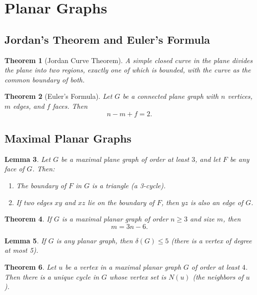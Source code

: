\documentclass{article}
\newtheorem{theorem}{Theorem}[section]
\newtheorem{lemma}[theorem]{Lemma}
\begin{document}
\section{Planar Graphs}

\subsection{Jordan's Theorem and Euler's Formula}
\begin{theorem}[Jordan Curve Theorem]
A simple closed curve in the plane divides the plane into two regions, exactly one of which is bounded, with the curve as the common boundary of both.
\end{theorem}

\begin{theorem}[Euler's Formula]
Let $G$ be a connected plane graph with $n$ vertices, $m$ edges, and $f$ faces. Then 
$$
n - m + f = 2.
$$
\end{theorem}

\subsection{Maximal Planar Graphs}
\begin{lemma}
Let $G$ be a maximal plane graph of order at least $3$, and let $F$ be any face of $G$. Then:
\begin{enumerate}
\item The boundary of $F$ in $G$ is a triangle (a 3-cycle).
\item If two edges $xy$ and $xz$ lie on the boundary of $F$, then $yz$ is also an edge of $G$.
\end{enumerate}
\end{lemma}

\begin{theorem}
If $G$ is a maximal planar graph of order $n\ge 3$ and size $m$, then 
$$
m = 3n - 6.
$$
\end{theorem}

\begin{lemma}
If $G$ is any planar graph, then $\delta(G)\le 5$ (there is a vertex of degree at most 5).
\end{lemma}

\begin{theorem}
Let $u$ be a vertex in a maximal planar graph $G$ of order at least $4$. Then there is a unique cycle in $G$ whose vertex set is $N(u)$ (the neighbors of $u$).
\end{theorem}
\end{document}
